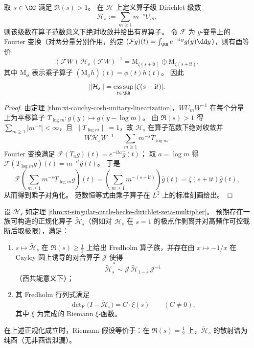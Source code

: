 \begin{theorem}\label{thm:xi-singular-circle-hecke-dirichlet-zeta-multiplier}
取 \(s\in\CC\) 满足 \(\Re(s)>1\)。
在 \(\mathcal H\) 上定义算子级 Dirichlet 级数
\[
\mathcal H_s:=\sum_{m\ge 1}m^{-s}U_m,
\]
则该级数在算子范数意义下绝对收敛并给出有界算子。
令 \(\mathcal F\) 为 \(y\)-变量上的 Fourier 变换（对两分量分别作用，约定
\((\mathcal Fg)(t)=\int_{\RR}e^{-\mathrm{i}ty}g(y)\dd y\)），则有酉等价
\[
(\mathcal F W)\,\mathcal H_s\,(\mathcal F W)^{-1}
=\mathrm{M}_{\zeta(s+\mathrm{i}t)}\oplus \mathrm{M}_{\zeta(s+\mathrm{i}t)},
\]
其中 \(\mathrm{M}_{\phi}\) 表示乘子算子 \((\mathrm{M}_{\phi}h)(t)=\phi(t)h(t)\)。
因此
\[
\|\mathcal H_s\|
=\operatorname*{ess\,sup}_{t\in\RR}|\zeta(s+\mathrm{i}t)|.
\]
\end{theorem}
\begin{proof}
由定理 \ref{thm:xi-cauchy-cosh-unitary-linearization}，\(WU_mW^{-1}\) 在每个分量上为平移算子
\(
T_{\log m}:g(y)\mapsto g(y-\log m)
\)。
由 \(\Re(s)>1\) 得 \(\sum_{m\ge 1}|m^{-s}|<\infty\)，且 \(\|T_{\log m}\|=1\)，故 \(\mathcal H_s\) 在算子范数下绝对收敛并
\[
W\mathcal H_sW^{-1}=\sum_{m\ge 1}m^{-s}T_{\log m}.
\]
Fourier 变换满足 \(\mathcal F(T_a g)(t)=e^{-\mathrm{i}ta}\widehat g(t)\)；
取 \(a=\log m\) 得 \(\mathcal F(T_{\log m}g)(t)=m^{-\mathrm{i}t}\widehat g(t)\)。
于是
\[
\mathcal F\left(\sum_{m\ge 1}m^{-s}T_{\log m}g\right)(t)
=\left(\sum_{m\ge 1}m^{-(s+\mathrm{i}t)}\right)\widehat g(t)
=\zeta(s+\mathrm{i}t)\widehat g(t),
\]
从而得到乘子对角化。
范数恒等式由乘子算子在 \(L^2\) 上的标准刻画给出。
\end{proof}

\begin{conjecture}\label{conj:xi-singular-circle-xi-scattering-determinant}
设 \(\mathcal H_s\) 如定理 \ref{thm:xi-singular-circle-hecke-dirichlet-zeta-multiplier}。
预期存在一族可构造的正规化算子 \(\widetilde{\mathcal H}_s\)（例如对 \(\mathcal H_s\) 在 \(s=1\) 的极点作剥离并对高频作可控截断后取极限），满足：
\begin{enumerate}
  \item \(s\mapsto \widetilde{\mathcal H}_s\) 在 \(\Re(s)\ge \tfrac12\) 上给出 Fredholm 算子族，并存在由 \(x\mapsto -1/x\) 在 Cayley 圆上诱导的对合算子 \(\mathcal J\) 使得
  \[
  \widetilde{\mathcal H}_s^{\,*}\sim \mathcal J\,\widetilde{\mathcal H}_{1-\overline{s}}\,\mathcal J^{-1}
  \]
  （酉共轭意义下）；
  \item 其 Fredholm 行列式满足
  \[
  \det\nolimits_{\mathrm F}\!\bigl(I-\widetilde{\mathcal H}_s\bigr)=C\cdot \xi(s)
  \qquad(C\neq 0),
  \]
  其中 \(\xi\) 为完成的 Riemann \(\xi\)-函数。
\end{enumerate}
在上述正规化成立时，Riemann 假设等价于：在 \(\Re(s)=\tfrac12\) 上，\(\widetilde{\mathcal H}_s\) 的散射谱为纯酉（无非酉谱泄漏）。
\end{conjecture}

\endinput

